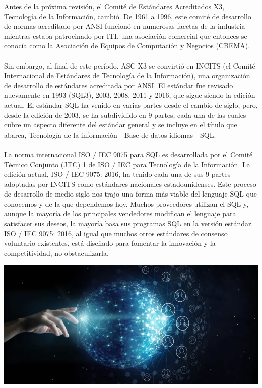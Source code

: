 \documentclass[preprint,12pt]{article}
\begin{document}
\begin{justify}
Antes de la próxima revisión, el Comité de Estándares Acreditados X3, Tecnología de la Información, cambió. De 1961 a 1996, este comité de desarrollo de normas acreditado por ANSI funcionó en numerosas facetas de la industria mientras estaba patrocinado por ITI, una asociación comercial que entonces se conocía como la Asociación de Equipos de Computación y Negocios (CBEMA).\\\\Sin embargo, al final de este período. ASC X3 se convirtió en INCITS (el Comité Internacional de Estándares de Tecnología de la Información), una organización de desarrollo de estándares acreditada por ANSI. El estándar fue revisado nuevamente en 1993 (SQL3), 2003, 2008, 2011 y 2016, que sigue siendo la edición actual. El estándar SQL ha venido en varias partes desde el cambio de siglo, pero, desde la edición de 2003, se ha subdividido en 9 partes, cada una de las cuales cubre un aspecto diferente del estándar general y se incluye en el título que abarca, Tecnología de la información - Base de datos idiomas - SQL.\\\\La norma internacional ISO / IEC 9075 para SQL es desarrollada por el Comité Técnico Conjunto (JTC) 1 de ISO / IEC para Tecnología de la Información. La edición actual, ISO / IEC 9075: 2016, ha tenido cada una de sus 9 partes adoptadas por INCITS como estándares nacionales estadounidenses. Este proceso de desarrollo de medio siglo nos trajo una forma más viable del lenguaje SQL que conocemos y de la que dependemos hoy. Muchos proveedores utilizan el SQL y, aunque la mayoría de los principales vendedores modifican el lenguaje para satisfacer sus deseos, la mayoría basa sus programas SQL en la versión estándar. ISO / IEC 9075: 2016, al igual que muchos otros estándares de consenso voluntario existentes, está diseñado para fomentar la innovación y la competitividad, no obstaculizarla.

\begin{center}
					\includegraphics[width=15cm]{./img/2}
				\end{center}	

\end{justify}
\end{document}
